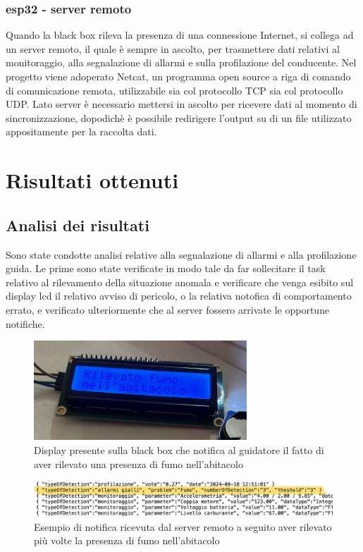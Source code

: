 \documentclass[12pt, a4paper, italian]{report}
\numberwithin{figure}{chapter}
\numberwithin{table}{chapter}
\begin{document}
\subsection{esp32 - server remoto}
Quando la black box rileva la presenza di una connessione Internet, si collega ad un server remoto, il quale è sempre in ascolto, per trasmettere dati relativi al monitoraggio, alla segnalazione di allarmi e sulla profilazione del conducente. 
Nel progetto viene adoperato Netcat, un programma open source a riga di comando di comunicazione remota, utilizzabile sia col protocollo TCP sia col protocollo UDP. Lato server è necessario mettersi in ascolto per ricevere dati al momento di sincronizzazione, dopodichè è possibile redirigere l'output su di un file utilizzato appositamente per la raccolta dati. \cite{Netcat}

\chapter{Risultati ottenuti}
\section{Analisi dei risultati}
Sono state condotte analisi relative alla segnalazione di allarmi e alla profilazione guida. Le prime sono state verificate in modo tale da far sollecitare il task relativo al rilevamento della situazione anomala e verificare che venga esibito sul display lcd il relativo avviso di pericolo, o la relativa notofica di comportamento errato, e verificato ulteriormente che al server fossero arrivate le opportune notifiche. 

\begin{figure}[h]
  \centering
  \includegraphics[width=8cm]{fumoLCD.png}
  \caption{Display presente sulla black box che notifica al guidatore il fatto di aver rilevato una presenza di fumo nell'abitacolo}
  \label{fig:fumoLCD}
\end{figure}

\begin{figure}[h]
  \centering
  \includegraphics[width=14cm]{fumoServer.jpg}
  \caption{Esempio di notifica ricevuta dal server remoto a seguito aver rilevato più volte la presenza di fumo nell'abitacolo}
  \label{fig:fumoServer}
\end{figure}
\end{document}
